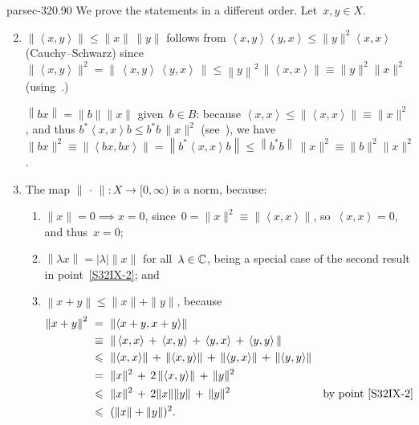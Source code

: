 \documentclass[b5page]{book}
\begin{document}
\begin{solution}{parsec-320.90}%
We prove the statements in a different order.
Let~$x,y\in X$.
\begin{enumerate}
\setcounter{enumi}{1}
\item
\label{S32IX-2}
$\left\|\left<x,y\right>\right\|\leq \|x\|\,\|y\|$
follows from  $\left<x,y\right>\left<y,x\right>
\leq \|y\|^2\left<x,x\right>$
(Cauchy--Schwarz)
since
$\|\left<x,y\right>\|^2
=\left\|\,\left<x,y\right>\,\left<y,x\right>\,\right\|
\leq \left\|y\right\|^2\,\left\|\left<x,x\right>\right\|
\equiv \|y\|^2\|x\|^2$
(using~.)

$\left\|bx\right\|=\|b\|\|x\|$ given~$b\in B$:
because $\left<x,x\right>\leq \left\|\left<x,x\right>\right\|
\equiv \|x\|^2$,
and
thus $b^*\left<x,x\right>b \leq b^*b\,\|x\|^2$
(see~),
we have
$\|bx\|^2
\equiv \left\|\left<bx,bx\right>\right\|
= \left\|b^*\left<x,x\right>b\right\|
\leq \left\|b^*b\right\|\,\|x\|^2
\equiv \|b\|^2\|x\|^2$.

\setcounter{enumi}{0}
\item
The map $\|\,\cdot\,\|\colon X\to [0,\infty)$
is a norm, because:
\begin{enumerate}
\item
$\|x\|=0\implies x=0$,
since~$0=\|x\|^2\equiv\|\left<x,x\right>\|$,
so~$\left<x,x\right>=0$,
and thus~$x=0$;

\item
$\left\|\lambda x\right\|=\left|\lambda\right|\|x\|$
for all~$\lambda\in \mathbb{C}$,
being a special case of the second
result in point~\ref{S32IX-2}; and

\item
$\left\|x+y\right\|\leq\|x\|+\|y\|$, 
because
\begin{alignat*}{3}
\left\|x+y\right\|^2 \ &=\ \left\|\left<x+y,x+y\right>\right\|\\
&\equiv\ \left\|\,
\left<x,x\right>\,+\,
\left<x,y\right>\,+\,
\left<y,x\right>\,+\,
\left<y,y\right>\,\right\| \\
&\leq\ 
\left\|\left<x,x\right>\right\| \,+\, 
\left\|\left<x,y\right>\right\| \,+\, 
\left\|\left<y,x\right>\right\| \,+\, 
\left\|\left<y,y\right>\right\|\\
&=\ 
\|x\|^2 \,+\, 2\left\|\left<x,y\right>\right\| \,+\, \|y\|^2\\
&\leq\ 
\|x\|^2 \,+\, 2\|x\|\|y\| \,+\, \|y\|^2
&&\text{by point~\ref{S32IX-2}}\\
&\leq\ 
(\|x\|+\|y\|)^2.
\end{alignat*}
\end{enumerate}
\end{enumerate}
\end{solution}
\end{document}
